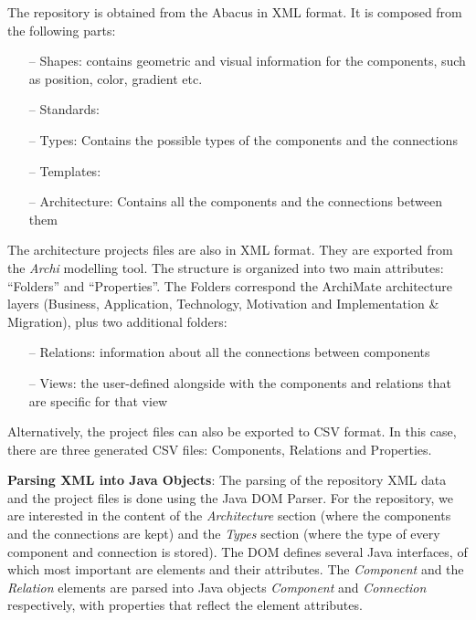 The repository is obtained from the Abacus in XML format. It is composed from the following parts:
 \begin{itemize}
 	\item[--] Shapes: contains geometric and visual information for the components, such as position, color, gradient etc.
 	\item[--] Standards: 
 	\item[--] Types: Contains the possible types of the components and the connections
 	\item[--] Templates: 
 	\item[--] Architecture: Contains all the components and the connections between them
\end{itemize}

The architecture projects files are also in XML format. 
They are exported from the \emph{Archi} modelling tool. 
The structure is organized into two main attributes: “Folders” and “Properties”. 
The Folders correspond the ArchiMate architecture layers (Business, Application, Technology, Motivation and Implementation \& Migration), plus two additional folders:
\begin{itemize}
		\item[--] Relations: information about all the connections between components
		\item[--] Views: the user-defined alongside with the components and relations that are specific for that view		
\end{itemize}
Alternatively, the project files can also be exported to CSV format. In this case, there are three generated CSV files: Components, Relations and Properties.

\textbf{Parsing XML into Java Objects}: 
The parsing of the repository XML data and the project files is done using the Java DOM Parser.
For the repository, we are interested in the content of the \emph{Architecture} section 
(where the components and the connections are kept) and the \emph{Types} section 
(where the type of every component and connection is stored).
The DOM defines several Java interfaces, of which most important are elements and their attributes. 
The \emph{Component} and the \emph{Relation} elements are parsed into Java objects \emph{Component} and \emph{Connection} respectively, with properties that reflect the element attributes.


